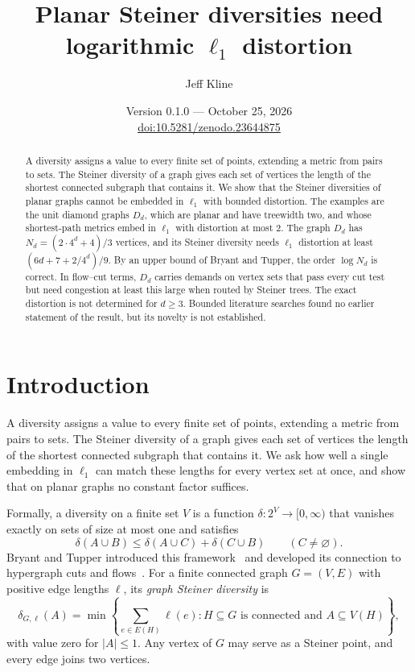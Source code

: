 \documentclass[11pt]{article}
\title{Planar Steiner diversities need logarithmic \texorpdfstring{$\ell_1$}{L1} distortion}
\author{Jeff Kline}
\date{Version 0.1.0 --- October 25, 2026\\[3pt]\small\href{https://doi.org/10.5281/zenodo.23644875}{doi:10.5281/zenodo.23644875}}
\begin{document}
\maketitle
\begin{abstract}
A diversity assigns a value to every finite set of points, extending a metric
from pairs to sets. The Steiner diversity of a graph gives each set of
vertices the length of the shortest connected subgraph that contains it. We
show that the Steiner diversities of planar graphs cannot be embedded in
$\ell_1$ with bounded distortion. The examples are the unit diamond graphs
$D_d$, which are planar and have treewidth two, and whose shortest-path
metrics embed in $\ell_1$ with distortion at most 2. The graph $D_d$ has
$N_d=(2\cdot4^d+4)/3$ vertices, and its Steiner diversity needs $\ell_1$
distortion at least $(6d+7+2/4^d)/9$. By an upper bound of Bryant and Tupper,
the order $\log N_d$ is correct. In flow--cut terms, $D_d$ carries demands on vertex sets that pass every cut test
but need congestion at least this large when routed by Steiner trees. The
exact distortion is not determined for $d\ge3$. Bounded literature searches
found no earlier statement of the result, but its novelty is not established.
\end{abstract}

\section{Introduction}
A diversity assigns a value to every finite set of points, extending a metric
from pairs to sets. The Steiner diversity of a graph gives each set of
vertices the length of the shortest connected subgraph that contains it. We
ask how well a single embedding in $\ell_1$ can match these lengths for every
vertex set at once, and show that on planar graphs no constant factor
suffices.

Formally, a diversity on a finite set $V$ is a function
$\delta:2^V\to[0,\infty)$ that vanishes exactly on sets of size at most one
and satisfies
\[
\delta(A\cup B)\le\delta(A\cup C)+\delta(C\cup B)
\qquad(C\ne\varnothing).
\]
Bryant and Tupper introduced this framework~\cite{BT12} and developed its
connection to hypergraph cuts and flows~\cite{BT14}. For a finite connected
graph $G=(V,E)$ with positive edge lengths $\ell$, its \emph{graph Steiner
diversity} is
\[
\delta_{G,\ell}(A)=\min\left\{\sum_{e\in E(H)}\ell(e):
 H\subseteq G\text{ is connected and }A\subseteq V(H)\right\},
\]
with value zero for $|A|\le1$. Any vertex of $G$ may serve as a Steiner
point, and every edge joins two vertices.
\end{document}
